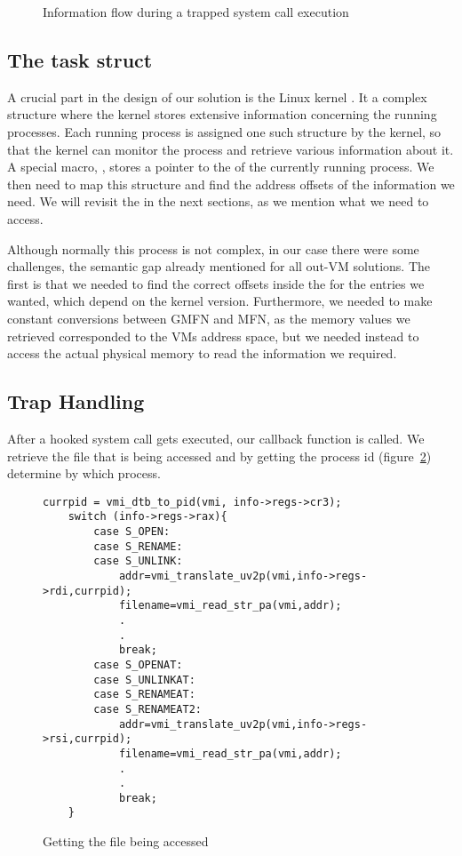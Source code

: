 \begin{figure}[ht]
	\centering
	
	\caption{Information flow during a trapped system call execution}
	\label{fig:overview}
\end{figure}


\subsection{The task struct}\label{sub:struct}
A crucial part in the design of our solution is the Linux kernel . It a complex structure where the kernel stores extensive information concerning the running processes. Each running process is assigned one such structure by the kernel, so that the kernel can monitor the process and retrieve various information about it. A special macro, , stores a pointer to the  of the currently running process. We then need to map this structure and find the address offsets of the information we need. We will revisit the  in the next sections, as we mention what we need to access.

\par Although normally this process is not complex, in our case there were some challenges, the semantic gap already mentioned for all out-\ac{VM} solutions. The first is that we needed to find the correct offsets inside the  for the entries we wanted, which depend on the kernel version. Furthermore, we needed to make constant conversions between \ac{GMFN} and \ac{MFN}, as the memory values we retrieved corresponded to the \ac{VM}s address space, but we needed instead to access the actual physical memory to read the information we required.


\subsection{Trap Handling}\label{sub:handling}

After a hooked system call gets executed, our callback function is called. We retrieve the file that is being accessed and by getting the  process id (figure~\ref{fig:getfile}) determine by which process. 

\begin{figure}[ht]
\selectfont
\begin{lstlisting}[style=CStyle]
	currpid = vmi_dtb_to_pid(vmi, info->regs->cr3);
	switch (info->regs->rax){
		case S_OPEN:
		case S_RENAME:
		case S_UNLINK:
			addr=vmi_translate_uv2p(vmi,info->regs->rdi,currpid);
			filename=vmi_read_str_pa(vmi,addr);
			.
			.
			break;
		case S_OPENAT:
		case S_UNLINKAT:
		case S_RENAMEAT:
		case S_RENAMEAT2:
			addr=vmi_translate_uv2p(vmi,info->regs->rsi,currpid);
			filename=vmi_read_str_pa(vmi,addr);
			.
			.
			break;	
	}
\end{lstlisting}
	\caption{Getting the file being accessed}
	\label{fig:getfile}
\end{figure}


